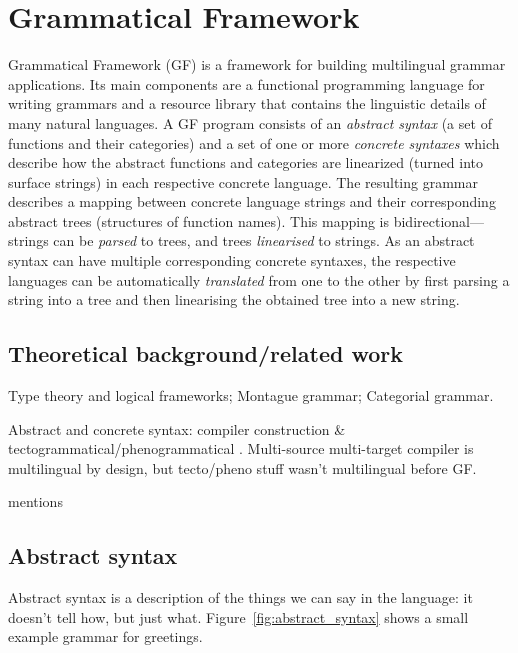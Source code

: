 \section{Grammatical Framework}
\label{sec:gf-intro}

Grammatical Framework (GF) \cite{ranta2011gfbook} 
is a framework for building multilingual grammar applications. Its main
components are a functional programming language for writing grammars
and a resource library that contains the linguistic details of many
natural languages.
A GF program consists of an \emph{abstract syntax} (a set of functions
and their categories) and a set of one or more
\emph{concrete syntaxes} which describe how the abstract
functions and categories are linearized (turned into surface strings) in each
respective concrete language. The resulting grammar
describes a mapping between concrete language strings and
their corresponding abstract trees (structures of function names).
This mapping is bidirectional---strings can be \emph{parsed} to
trees, and trees \emph{linearised} to strings.
As an abstract syntax can have multiple corresponding concrete syntaxes,
the respective languages can be automatically \emph{translated} from one to the other by
first parsing a string into a tree and then linearising the obtained tree
into a new string.

\subsection{Theoretical background/related work}

Type theory and logical frameworks; Montague grammar; Categorial grammar.

Abstract and concrete syntax: compiler construction \& tectogrammatical/phenogrammatical . Multi-source multi-target compiler is multilingual by design, but tecto/pheno stuff wasn't multilingual before GF.

\cite{ranta2011gfbook} mentions 


\subsection{Abstract syntax}

Abstract syntax is a description of the things we can say in the
language: it doesn't tell how, but just
what. Figure~\ref{fig:abstract_syntax} shows a small example grammar
for greetings.


